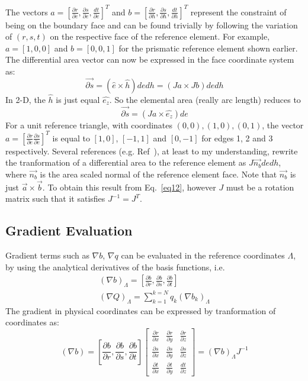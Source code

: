 \documentclass[11pt]{article}
\begin{document}
The vectors $a=\left[\frac{\partial r}{\partial e}, \frac{\partial s}{\partial e}, \frac{dt}{\partial e}\right]^T$ and
$b=\left[\frac{\partial r}{\partial h}, \frac{\partial s}{\partial h}, \frac{dt}{\partial h}\right]^T$ represent the constraint of being on the
boundary face and can be found trivially by following the variation of $(r,s,t)$ on the
respective  face of the reference element. For example,
$a=[1,0,0]$ and $b=[0,0,1]$ for the prismatic reference element shown earlier. The
differential area vector can now be expressed in the face coordinate system as:
\begin{equation}
  \vec{\partial s} = (\hat{e} \times \hat{h}) de dh
  = (Ja \times Jb) dedh
  \label{eq12}
\end{equation}
In 2-D, the $\hat{h}$ is just equal $\hat{e_z}$. So the elemental area (really arc length) reduces to
\begin{equation}
  \vec{\partial s} = (Ja \times \hat{e_z}) de 
\end{equation}
For a unit reference triangle, with coordinates $(0,0),(1,0),(0,1)$, the vector $a=[\frac{\partial r}{\partial e} \frac{\partial s}{\partial e}]^T$ is equal
to $[1,0]$, $[-1,1]$ and $[0,-1]$ for edges 1, 2 and 3 respectively. Several references (e.g. Ref~\cite{atkins}), at least to
my understanding, rewrite the tranformation of a differential area to the reference element as $J\vec{n_b} dedh$, where
$\vec{n_b}$ is the area scaled normal of the reference element face. Note that $\vec{n_b}$ is just $\vec{a} \times \vec{b}$.
To obtain this result from Eq.~\ref{eq12}, however $J$ must be a rotation matrix such that it satisfies $J^{-1}=J^T$. 
\subsection{Gradient Evaluation}
Gradient terms such as $\nabla b$, $\nabla q$ can be evaluated in the reference coordinates $\Lambda$,
by using the analytical derivatives of the basis functions, i.e.
\begin{eqnarray}
  (\nabla b)_\Lambda = \left[\frac{\partial b}{\partial r},\frac{\partial b}{\partial s},\frac{\partial b}{\partial t}\right]\\
  (\nabla Q)_\Lambda = \sum_{k=1}^{k=N} q_k(\nabla b_k)_\Lambda
\end{eqnarray}
The gradient in physical coordinates can be expressed by tranformation of coordinates as:
\begin{equation}
  (\nabla b) =
  \left[\frac{\partial b}{\partial r},\frac{\partial b}{\partial s},\frac{\partial b}{\partial t}\right]
  \begin{bmatrix}
  \frac{\partial r}{\partial x} & \frac{\partial r}{\partial y} & \frac{\partial r}{\partial z} \\
  \frac{\partial s}{\partial x} & \frac{\partial s}{\partial y} & \frac{\partial s}{\partial z} \\
  \frac{\partial t}{\partial x} & \frac{\partial t}{\partial y} & \frac{dt}{\partial z}
  \end{bmatrix}
  =(\nabla b)_\Lambda J^{-1}
\end{equation}
\end{document}
